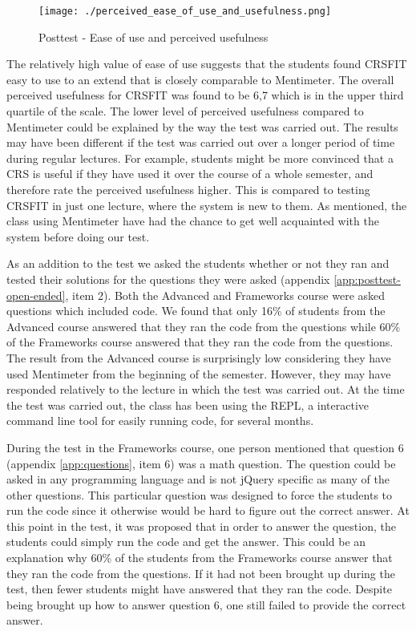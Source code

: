  \begin{figure}[H]
  \centering
     \texttt{[image: ./perceived\_ease\_of\_use\_and\_usefulness.png]}
     \caption{Posttest - Ease of use and perceived usefulness}
     \label{fig:perceived_ease_of_use_and_usefulness}
 \end{figure}
 
The relatively high value of ease of use suggests that the students found CRSFIT easy to use to an extend that is closely comparable to Mentimeter. The overall perceived usefulness for CRSFIT was found to be 6,7 which is in the upper third quartile of the scale. The lower level of perceived usefulness compared to Mentimeter could be explained by the way the test was carried out. The results may have been different if the test was carried out over a longer period of time during regular lectures. For example, students might be more convinced that a CRS is useful if they have used it over the course of a whole semester, and therefore rate the perceived usefulness higher. This is compared to testing CRSFIT in just one lecture, where the system is new to them. As mentioned, the class using Mentimeter have had the chance to get well acquainted with the system before doing our test.

As an addition to the test we asked the students whether or not they ran and tested their solutions for the questions they were asked (appendix \ref{app:posttest-open-ended}, item 2). Both the Advanced and Frameworks course were asked questions which included code. We found that only 16\% of students from the Advanced course answered that they ran the code from the questions while 60\% of the Frameworks course answered that they ran the code from the questions. The result from the Advanced course is surprisingly low considering they have used Mentimeter from the beginning of the semester. However, they may have responded relatively to the lecture in which the test was carried out. At the time the test was carried out, the class has been using the REPL, a interactive command line tool for easily running code, for several months.


During the test in the Frameworks course, one person mentioned that question 6 (appendix \ref{app:questions}, item 6) was a math question. The question could be asked in any programming language and is not jQuery specific as many of the other questions. This particular question was designed to force the students to run the code since it otherwise would be hard to figure out the correct answer. At this point in the test, it was proposed that in order to answer the question, the students could simply run the code and get the answer. This could be an explanation why 60\% of the students from the Frameworks course answer that they ran the code from the questions. If it had not been brought up during the test, then fewer students might have answered that they ran the code. Despite being brought up how to answer question 6, one still failed to provide the correct answer.

